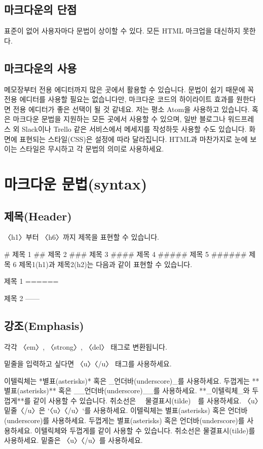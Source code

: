 \documentclass[12pt, a4paper, oneside]{book}
\let\stdsection\section
\renewcommand\section{\newpage\stdsection}
\begin{document}
				\section{마크다운의 단점}
				표준이 없어 사용자마다 문법이 상이할 수 있다.
				모든 HTML 마크업을 대신하지 못한다.
			
				\section{마크다운의 사용}
			
				메모장부터 전용 에디터까지 많은 곳에서 활용할 수 있습니다.
				문법이 쉽기 때문에 꼭 전용 에디터를 사용할 필요는 없습니다만, 마크다운 코드의 하이라이트 효과를 원한다면 전용 에디터가 좋은 선택이 될 것 같네요.
				저는 평소 Atom을 사용하고 있습니다.
				혹은 마크다운 문법을 지원하는 모든 곳에서 사용할 수 있으며, 일반 블로그나 워드프레스 외 Slack이나 Trello 같은 서비스에서 메세지를 작성하듯 사용할 수도 있습니다.
				화면에 표현되는 스타일(CSS)은 설정에 따라 달라집니다.
				HTML과 마찬가지로 눈에 보이는 스타일은 무시하고 각 문법의 의미로 사용하세요.
				

				\chapter 	{마크다운 문법(syntax)}
				\minitoc 
			
				\section{제목(Header)}
				〈h1〉부터 〈h6〉까지 제목을 표현할 수 있습니다.
				
				\# 제목 1
				\#\# 제목 2
				\#\#\# 제목 3
				\#\#\#\# 제목 4
				\#\#\#\#\# 제목 5
				\#\#\#\#\#\# 제목 6
				제목1(h1)과 제목2(h2)는 다음과 같이 표현할 수 있습니다.
				
				제목 1
				======
				
				제목 2
				------
						
				\section{강조(Emphasis)}
				
				각각 〈em〉, 〈strong〉, 〈del〉 태그로 변환됩니다.
				
				밑줄을 입력하고 싶다면 〈u〉〈/u〉 태그를 사용하세요.
				
				이텔릭체는 *별표(asterisks)* 혹은 \_언더바(underscore)\_를 사용하세요.
				두껍게는 **별표(asterisks)** 혹은 \_\_언더바(underscore)\_\_를 사용하세요.
				**\_이텔릭체\_와 두껍게**를 같이 사용할 수 있습니다.
				취소선은 ~~물결표시(tilde)~~를 사용하세요.
				〈u〉밑줄〈/u〉은 `〈u〉〈/u〉`를 사용하세요.
				이텔릭체는 별표(asterisks) 혹은 언더바(underscore)를 사용하세요.
				두껍게는 별표(asterisks) 혹은 언더바(underscore)를 사용하세요.
				이텔릭체와 두껍게를 같이 사용할 수 있습니다.
				취소선은 물결표시(tilde)를 사용하세요.
				밑줄은 〈u〉〈/u〉를 사용하세요.
			
\end{document}
